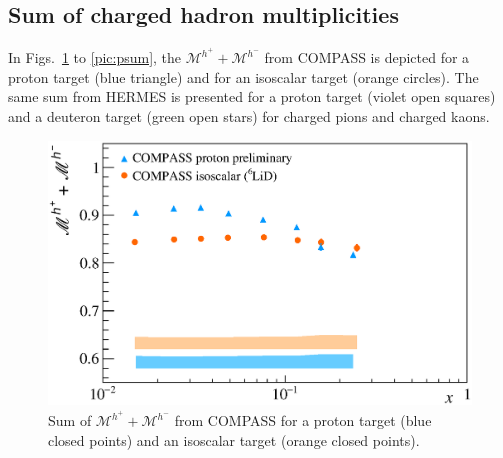 \subsection{Sum of charged hadron multiplicities}

In Figs.~\ref{pic:hsum} to \ref{pic:psum}, the $\mathscr{M}^{h^+}+\mathscr{M}^{h^-}$ from COMPASS is depicted for a proton target (blue triangle) and for an isoscalar target (orange circles). The same sum from HERMES is presented for a proton target (violet open squares) and a deuteron target (green open stars) for charged pions and charged kaons.

\begin{figure}[!h]
  \centering
	\includegraphics[scale=0.5]{./gfx/Mult_h_sum.eps}
	\caption{Sum of $\mathscr{M}^{h^+}+\mathscr{M}^{h^-}$ from COMPASS for a proton target (blue closed points) and an isoscalar target (orange closed points).}
	\label{pic:hsum}
\end{figure}

